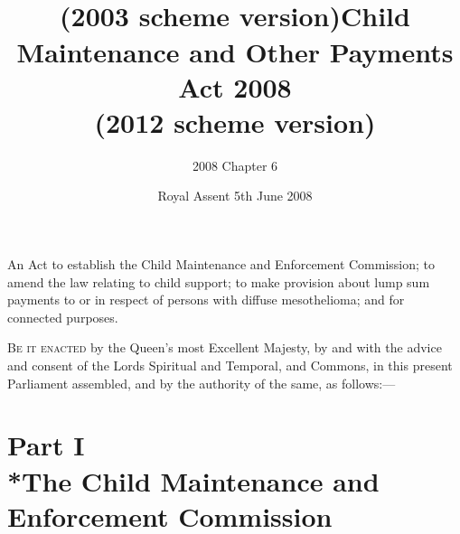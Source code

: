 \documentclass[12pt,a4paper]{article}
\title{\regstitle\\(2003 scheme version)}
\title{Child Maintenance and Other Payments Act 2008\\(2012 scheme version)}
\author{2008 Chapter 6}
\date{Royal Assent
5th June 2008\\
}
\begin{document}
\maketitle

\noindent
{\large An Act to establish the Child Maintenance and Enforcement Commission; to amend the law relating to child support; to make provision about lump sum payments to or in respect of persons with diffuse mesothelioma; and for connected purposes.}

\bigskip

\lettrine{B}{e it enacted} by the Queen’s most Excellent Majesty, by and with the advice and consent of the Lords Spiritual and Temporal, and Commons, in this present Parliament assembled, and by the authority of the same, as follows:—


{\sloppy

\tableofcontents

}

\setcounter{secnumdepth}{-2}

\part[Part I --- The Child Maintenance and Enforcement Commission]{Part I\\*The Child Maintenance and Enforcement Commission}

\renewcommand\parthead{--- Part I}

\end{document}
